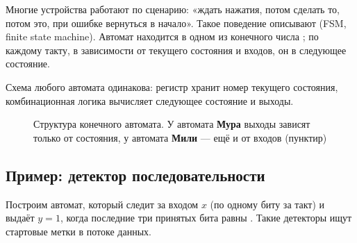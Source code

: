 Многие устройства работают по сценарию: «ждать нажатия, потом сделать то, потом
это, при ошибке вернуться в начало». Такое поведение описывают
 (FSM, finite state machine). Автомат находится в
одном из конечного числа ; по каждому такту, в зависимости от
текущего состояния и входов, он  в следующее состояние.

Схема любого автомата одинакова: регистр хранит номер текущего состояния,
комбинационная логика вычисляет следующее состояние и выходы.

\begin{figure}[H]
\centering
{}
\caption{Структура конечного автомата. У автомата \textbf{Мура} выходы зависят
только от состояния, у автомата \textbf{Мили} --- ещё и от входов (пунктир)}
\label{fig:fsm_struct}
\end{figure}

\subsection{Пример: детектор последовательности}

Построим автомат, который следит за входом $x$ (по одному биту за такт) и
выдаёт $y=1$, когда последние три принятых бита равны . Такие
детекторы ищут стартовые метки в потоке данных.

